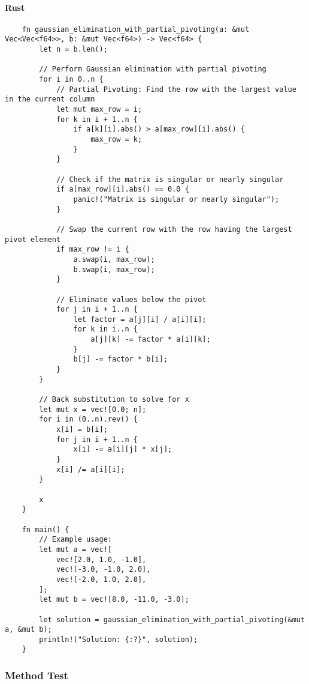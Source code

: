\documentclass{article}
\begin{document}
            \paragraph{Rust}
                \begin{verbatim}
    fn gaussian_elimination_with_partial_pivoting(a: &mut Vec<Vec<f64>>, b: &mut Vec<f64>) -> Vec<f64> {
        let n = b.len();

        // Perform Gaussian elimination with partial pivoting
        for i in 0..n {
            // Partial Pivoting: Find the row with the largest value in the current column
            let mut max_row = i;
            for k in i + 1..n {
                if a[k][i].abs() > a[max_row][i].abs() {
                    max_row = k;
                }
            }

            // Check if the matrix is singular or nearly singular
            if a[max_row][i].abs() == 0.0 {
                panic!("Matrix is singular or nearly singular");
            }

            // Swap the current row with the row having the largest pivot element
            if max_row != i {
                a.swap(i, max_row);
                b.swap(i, max_row);
            }

            // Eliminate values below the pivot
            for j in i + 1..n {
                let factor = a[j][i] / a[i][i];
                for k in i..n {
                    a[j][k] -= factor * a[i][k];
                }
                b[j] -= factor * b[i];
            }
        }

        // Back substitution to solve for x
        let mut x = vec![0.0; n];
        for i in (0..n).rev() {
            x[i] = b[i];
            for j in i + 1..n {
                x[i] -= a[i][j] * x[j];
            }
            x[i] /= a[i][i];
        }

        x
    }

    fn main() {
        // Example usage:
        let mut a = vec![
            vec![2.0, 1.0, -1.0],
            vec![-3.0, -1.0, 2.0],
            vec![-2.0, 1.0, 2.0],
        ];
        let mut b = vec![8.0, -11.0, -3.0];

        let solution = gaussian_elimination_with_partial_pivoting(&mut a, &mut b);
        println!("Solution: {:?}", solution);
    }
                \end{verbatim}
        \subsubsection{Method Test}
\end{document}
